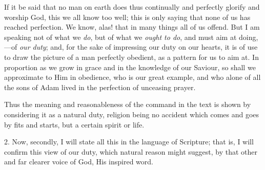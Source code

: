 If it be said that no man on earth does thus continually and
perfectly glorify and worship God, this we all know too well; this is
only saying that none of us has reached perfection. We know, alas!
that in many things all of us offend. But I am speaking not of what we
\emph{do}, but of what we \emph{ought to do}, and must aim at doing,—of
\emph{our duty}; and, for the sake of impressing our duty on our
hearts, it is of use to draw the picture of a man perfectly obedient,
as a pattern for us to aim at. In proportion as we grow in grace and
in the knowledge of our Saviour, so shall we approximate to Him in
obedience, who is our great example, and who alone of all the sons of
Adam lived in the perfection of unceasing prayer.

Thus the meaning and reasonableness of the command in the text is
shown by considering it as a natural duty, religion being no accident
which comes and goes by fits and starts, but a certain spirit or life.

2. Now, secondly, I will state all this in the language of
Scripture; that is, I will confirm this view of our duty, which
natural reason might suggest, by that other and far clearer voice of
God, His inspired word.

